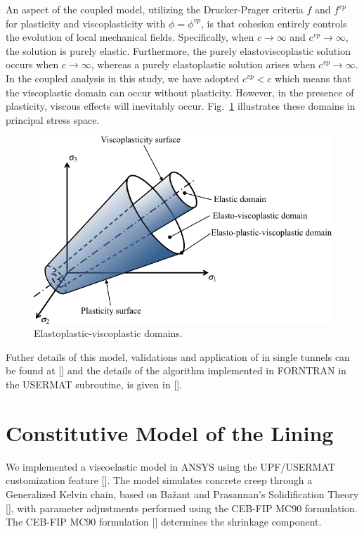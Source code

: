 \documentclass[a4paper,fleqn]{cas-sc}
\begin{document}
An aspect of the coupled model, utilizing the Drucker-Prager criteria $f$ and $f^{vp}$ for plasticity and viscoplasticity with $\phi=\phi^{vp}$, is that cohesion entirely controls the evolution of local mechanical fields. Specifically, when $c \rightarrow \infty$ and $c^{vp} \rightarrow \infty$, the solution is purely elastic. Furthermore, the purely elastoviscoplastic solution occurs when $c \rightarrow \infty$, whereas a purely elastoplastic solution arises when $c^{vp} \rightarrow \infty$. In the coupled analysis in this study, we have adopted $c^{vp} < c$ which means that the viscoplastic domain can occur without plasticity. However, in the presence of plasticity, viscous effects will inevitably occur. Fig.~\ref{epvpdomains} illustrates these domains in principal stress space.
\begin{figure}
	\centering
	\includegraphics[scale=0.8]{FIG3.pdf}
	\caption{Elastoplastic-viscoplastic domains.}
	\label{epvpdomains}
\end{figure}

Futher details of this model, validations and application of in single tunnels can be found at [] and the details of the algorithm implemented in FORNTRAN in the USERMAT subroutine, is given in [].

\section{Constitutive Model of the Lining}\label{}

We implemented a viscoelastic model in ANSYS using the UPF/USERMAT customization feature []. The model simulates concrete creep through a Generalized Kelvin chain, based on Bažant and Prasannan's Solidification Theory [], with parameter adjustments performed using the CEB-FIP MC90 formulation. The CEB-FIP MC90 formulation [] determines the shrinkage component. 
\end{document}
